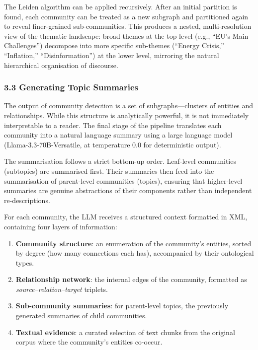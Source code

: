 \documentclass[11pt]{article}
\begin{document}
The Leiden algorithm can be applied recursively. After an initial partition is found, each community can be treated as a new subgraph and partitioned again to reveal finer-grained sub-communities. This produces a nested, multi-resolution view of the thematic landscape: broad themes at the top level (e.g., ``EU's Main Challenges'') decompose into more specific sub-themes (``Energy Crisis,'' ``Inflation,'' ``Disinformation'') at the lower level, mirroring the natural hierarchical organisation of discourse.


\subsubsection{3.3 Generating Topic Summaries}


The output of community detection is a set of subgraphs---clusters of entities and relationships. While this structure is analytically powerful, it is not immediately interpretable to a reader. The final stage of the pipeline translates each community into a natural language summary using a large language model (Llama-3.3-70B-Versatile, at temperature 0.0 for deterministic output).

The summarisation follows a strict bottom-up order. Leaf-level communities (subtopics) are summarised first. Their summaries then feed into the summarisation of parent-level communities (topics), ensuring that higher-level summaries are genuine abstractions of their components rather than independent re-descriptions.

For each community, the LLM receives a structured context formatted in XML, containing four layers of information:

\begin{enumerate}
  \item \textbf{Community structure}: an enumeration of the community's entities, sorted by degree (how many connections each has), accompanied by their ontological types.
  \item \textbf{Relationship network}: the internal edges of the community, formatted as \emph{source--relation--target} triplets.
  \item \textbf{Sub-community summaries}: for parent-level topics, the previously generated summaries of child communities.
  \item \textbf{Textual evidence}: a curated selection of text chunks from the original corpus where the community's entities co-occur.
\end{enumerate}
\end{document}
